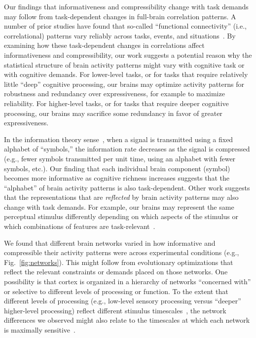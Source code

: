 \documentclass[english, 11pt]{article}
\begin{document}
Our findings that informativeness and compressibility change with task demands
may follow from task-dependent changes in full-brain correlation patterns. A
number of prior studies have found that so-called ``functional connectivity''
(i.e., correlational) patterns vary reliably across tasks, events, and
situations~\citep{SimoEtal16, ColeEtal14, SmitEtal09, OwenEtal21}. By examining
how these task-dependent changes in correlations affect informativeness and
compressibility, our work suggests a potential reason why the statistical
structure of brain activity patterns might vary with cognitive task or with
cognitive demands. For lower-level tasks, or for tasks that require relatively
little ``deep'' cognitive processing, our brains may optimize activity patterns
for robustness and redundancy over expressiveness, for example to maximize
reliability. For higher-level tasks, or for tasks that require deeper cognitive
processing, our brains may sacrifice some redundancy in favor of greater
expressiveness.

In the information theory sense~\citep{Shan48}, when a signal is transmitted
using a fixed alphabet of ``symbols,'' the information rate decreases as the
signal is compressed (e.g., fewer symbols transmitted per unit time, using an
alphabet with fewer symbols, etc.). Our finding that each individual brain
component (symbol) becomes more informative as cognitive richness increases
suggests that the ``alphabet'' of brain activity patterns is also
task-dependent. Other work suggests that the representations that are
\textit{reflected} by brain activity patterns may also change with task
demands. For example, our brains may represent the same perceptual stimulus
differently depending on which aspects of the stimulus or which combinations of
features are task-relevant~\citep{MackEtal20}.

We found that different brain networks varied in how informative and
compressible their activity patterns were across experimental conditions (e.g.,
Fig.~\ref{fig:networks}). This might
follow from evolutionary optimizations that reflect the relevant constraints or
demands placed on those networks. One possibility is that cortex is organized
in a hierarchy of networks ``concerned with'' or selective to different levels
of processing or function. To the extent that different levels of processing
(e.g., low-level sensory processing versus ``deeper'' higher-level processing)
reflect different stimulus timescales~\citep[e.g.,][]{Mann20}, the network
differences we observed might also relate to the timescales at which each
network is maximally sensitive~\citep{RegeEtal18, BaldEtal17,LernEtal11,
HassEtal08}.
\end{document}
